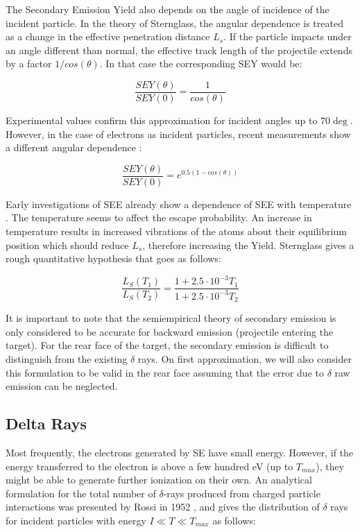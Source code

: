 The Secondary Emission Yield also depends on the angle of incidence of the incident particle. In the theory of Sternglass, the angular dependence is treated as a change in the effective penetration distance $L_{s}$. If the particle impacts under an angle different than normal, the effective track length of the projectile extends by a factor $1/cos(\theta)$. In that case the corresponding SEY would be: 

\begin{equation}
    \frac{SEY(\theta)}{SEY(0)} = \frac{1}{cos(\theta)}
\end{equation}

Experimental values confirm this approximation for incident angles up to $70\deg$. However, in the case of electrons as incident particles, recent measurements show a different angular dependence \parencite*[][]{ref:seyAngleEl}: 

\begin{equation}
    \frac{SEY(\theta)}{SEY(0)} = e^{0.5 \left(1-cos(\theta)\right)}
\end{equation}

Early investigations of SEE already show a dependence of SEE with temperature \parencite*[][]{ref:SeyVsTemp}. The temperature seems to affect the escape probability. An increase in temperature results in increased vibrations of the atoms about their equilibrium position which should reduce $L_{s}$, therefore increasing the Yield. Sternglass gives a rough quantitative hypothesis that goes as follows: 

\begin{equation}
    \frac{L_S (T_1)}{L_S(T_2)} = \frac{1+2.5\cdot 10^{-3}T_1}{1+2.5\cdot 10^{-3}T_2}
\end{equation}

It is important to note that the semiempirical theory of secondary emission is only considered to be accurate for backward emission (projectile entering the target). For the rear face of the target, the secondary emission is difficult to distinguish from the existing $\delta$ rays. On first approximation, we will also consider this formulation to be valid in the rear face assuming that the error due to $\delta$ raw emission can be neglected.  

\subsection{Delta Rays}

Most frequently, the electrons generated by SE have small energy. However, if the energy transferred to the electron is above a few hundred \si[]{\electronvolt} (up to $T_{max}$), they might be able to generate further ionization on their own. An analytical formulation for the total number of $\delta$-rays produced from charged particle interactions was presented by Rossi in 1952 \parencite*[][]{ref:delta1}, and gives the distribution of $\delta$ rays for incident particles with energy $I \ll T \ll T_{max}$ as follows: 

